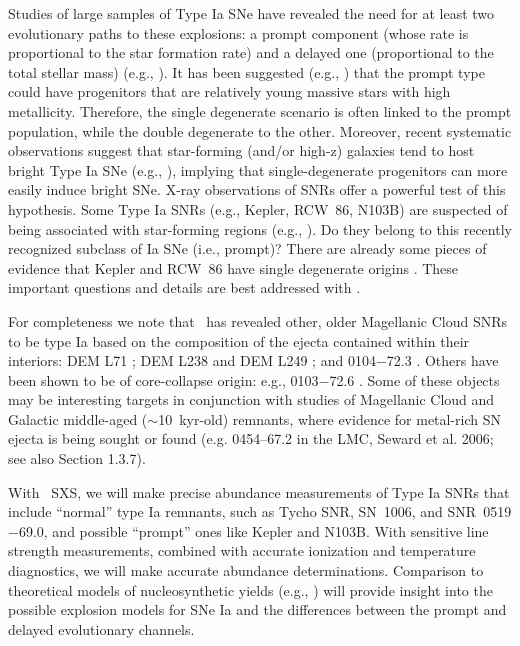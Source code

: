 \documentclass[11pt,a4paper]{article}
\begin{document}
Studies of large samples of Type Ia SNe have revealed the need for at
least two evolutionary paths to these explosions: a prompt component
(whose rate is proportional to the star formation rate) and a delayed
one (proportional to the total stellar mass) (e.g.,
\citealt{scannapieco05}).  It has been suggested (e.g.,
\citealt{aubourg08}) that the prompt type could have progenitors that
are relatively young massive stars with high metallicity.
Therefore, the single degenerate scenario is often linked to the
prompt population, while the double degenerate to the other. Moreover,
recent systematic observations suggest that star-forming (and/or
high-z) galaxies tend to host bright Type Ia SNe (e.g.,
\citealt{howell09, sullivan10}), implying that single-degenerate
progenitors can more easily induce bright SNe. X-ray observations of
SNRs offer a powerful test of this hypothesis. Some Type Ia SNRs
(e.g., Kepler, RCW~86, N103B) are suspected of being associated with
star-forming regions (e.g., \citealt{rosado96, chu88}). Do they belong
to this recently recognized subclass of Ia SNe (i.e., prompt)? There
are already some pieces of evidence that Kepler and RCW~86 have single
degenerate origins \citep{williams11, williams12}. 
These important questions and details are best addressed with \ah.

For completeness we note that \chandra\ has revealed other, older
Magellanic Cloud SNRs to be type Ia based on the composition of the
ejecta contained within their interiors: DEM L71 \citep{hughes03}; DEM
L238 and DEM L249 \citep{borkowski06}; and 0104$-$72.3 \citep{lee11}.
Others have been shown to be of core-collapse origin: e.g., 0103$-$72.6
\citep{park03}.  Some of these objects may be interesting targets in
conjunction with studies of Magellanic Cloud and Galactic middle-aged ($\sim$10~kyr-old) remnants, where
evidence for metal-rich SN ejecta is being sought or found (e.g. 
0454--67.2 in the LMC, Seward et al. 2006; see also Section 1.3.7).

With \ah\ SXS, we will make precise abundance measurements of 
Type Ia SNRs that include ``normal'' type Ia remnants, such as 
Tycho SNR, SN~1006, and SNR~0519$-$69.0,
and possible ``prompt'' ones like Kepler and N103B.  With
sensitive line strength measurements, combined with accurate
ionization and temperature diagnostics, we will make accurate
abundance determinations. Comparison to theoretical models of
nucleosynthetic yields (e.g., \citealt{iwamoto99,maeda10b}) will
provide insight into the possible explosion models for SNe Ia and the
differences between the prompt and delayed evolutionary channels.
\end{document}
